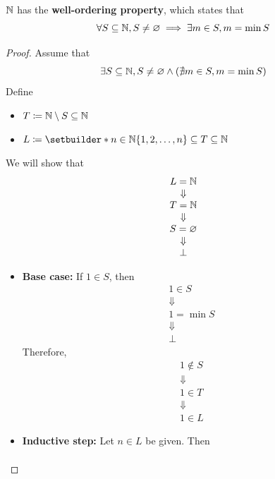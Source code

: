 \bigskip

\begin{theorem} \label{an:thm:well-ordering-property}
    $\mathbb{N}$ has the \textbf{well-ordering property}, which states that
    \[
    \forall S \subseteq \mathbb{N}, S \neq \varnothing \implies \exists m \in S, m = \min S
    \]
\end{theorem}

\begin{proof}
    Assume that
    \[
    \exists S \subseteq \mathbb{N}, S \neq \varnothing \land (\nexists m \in S, m = \min S)
    \]
    Define
    \begin{itemize}
        \item $T \coloneqq \mathbb{N} \setminus S \subseteq \mathbb{N}$
        \item $L \coloneqq \setbuilder*{n \in \N}{\set*{1, 2, \dots, n} \subseteq T} \subseteq \N$
    \end{itemize}
    We will show that
    \[
    \begin{array}{c}
        L = \mathbb{N} \\
        \Downarrow \\
        T = \mathbb{N} \\
        \Downarrow \\
        S = \varnothing \\
        \Downarrow \\
        \bot
    \end{array}
    \]
    \begin{itemize}
        \item \textbf{Base case:} If $1 \in S$, then
        \[
        \begin{array}{c}
            1 \in S \\
            \Downarrow \\
            1 = \min S \\
            \Downarrow \\
            \bot
        \end{array}
        \]
        Therefore,
        \[
        \begin{array}{c}
            1 \notin S \\
            \Downarrow \\
            1 \in T \\
            \Downarrow \\
            1 \in L
        \end{array}
        \]
        \item \textbf{Inductive step:} Let $n \in L$ be given. Then
        \[
        \begin{array}{c}

\end{array}\]
\end{itemize}
\end{proof}
